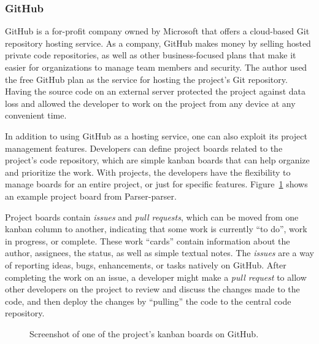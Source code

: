 \documentclass[english,bachelors,forcepolishlogotype]{wizthesis}
\newcommand{\thisproject}{Parser-parser}
\begin{document}
\subsubsection*{GitHub}

GitHub \cite{github} is a for-profit company owned by Microsoft that offers a
cloud-based Git repository hosting service. As a company, GitHub makes money by
selling hosted private code repositories, as well as other business-focused
plans that make it easier for organizations to manage team members and security.
The author used the free GitHub plan as the service for hosting the project's
Git repository. Having the source code on an external server protected the
project against data loss and allowed the developer to work on the project from
any device at any convenient time.

In addition to using GitHub as a hosting service, one can also exploit its
project management features. Developers can define project boards related to the
project's code repository, which are simple kanban \cite{ahmad-2013} boards that
can help organize and prioritize the work. With projects, the developers have
the flexibility to manage boards for an entire project, or just for specific
features. Figure~\ref{fig:github-projects} shows an example project board from
\thisproject{}.

Project boards contain \emph{issues} and \emph{pull requests}, which can be
moved from one kanban column to another, indicating that some work is currently
``to do'', work in progress, or complete. These work ``cards'' contain
information about the author, assignees, the status, as well as simple textual
notes. The \emph{issues} are a way of reporting ideas, bugs, enhancements, or
tasks natively on GitHub. After completing the work on an issue, a developer
might make a \emph{pull request} to allow other developers on the project to
review and discuss the changes made to the code, and then deploy the changes by
``pulling'' the code to the central code repository.

\begin{figure}[h]
  \centering
  \caption{Screenshot of one of the project's kanban boards on GitHub.}
  \label{fig:github-projects}
\end{figure}
\end{document}
